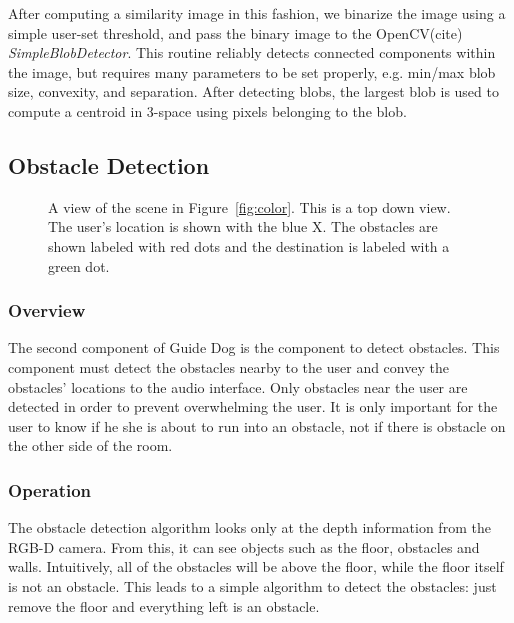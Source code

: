 After computing a similarity image in this fashion, we binarize the image
using a simple user-set threshold, and pass the binary image to the OpenCV(cite)
\emph{SimpleBlobDetector}. This routine reliably detects connected components
within the image, but requires many parameters to be set properly, e.g.
min/max blob size, convexity, and separation. After detecting blobs, the 
largest blob is used to compute a centroid in 3-space using pixels belonging 
to the blob.

\subsection{Obstacle Detection}
\label{sec:technical-obs}

\begin{figure}
\caption{A view of the scene in Figure~\ref{fig:color}. This is a top down view.
  The user's location is shown with the blue X. The obstacles are shown labeled
  with red dots and the destination is labeled with a green dot.}
\label{fig:obstacle}
\end{figure}

\subsubsection{Overview}
\label{sec:technical-obs-overview}

The second component of Guide Dog is the component to detect obstacles. This
component must detect the obstacles nearby to the user and convey the obstacles'
locations to the audio interface. Only obstacles near the user are detected in
order to prevent overwhelming the user. It is only important for the user to
know if he she is about to run into an obstacle, not if there is obstacle on the
other side of the room.

\subsubsection{Operation}
\label{sec:technical-obs-op}

The obstacle detection algorithm looks only at the depth information from the
RGB-D camera. From this, it can see objects such as the floor, obstacles and
walls. Intuitively, all of the obstacles will be above the floor, while the floor
itself is not an obstacle. This leads to a simple algorithm to detect the
obstacles: just remove the floor and everything left is an obstacle.

